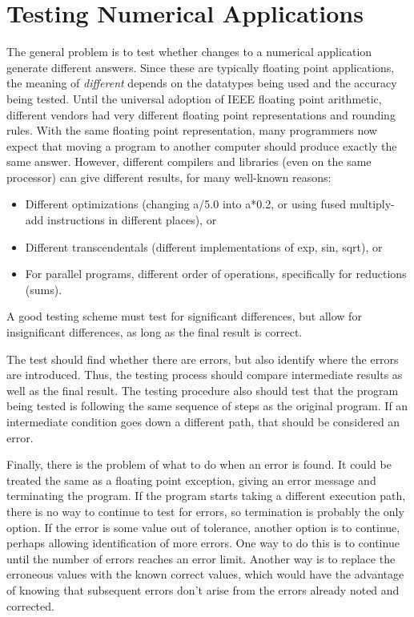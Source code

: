 \section{Testing Numerical Applications}

The general problem is to test whether changes to a numerical application generate different answers.
Since these are typically floating point applications, the meaning of \emph{different} depends on the datatypes being used and the accuracy being tested.
Until the universal adoption of IEEE floating point arithmetic\cite{goldberg.cs.91}, different vendors had very different floating point representations and rounding rules.
With the same floating point representation, many programmers now expect that moving a program to another computer should produce exactly the same answer.
However, different compilers and libraries (even on the same processor) can give different results, for many well-known reasons:
\begin{itemize}
\item Different optimizations (changing a/5.0 into a*0.2, or using fused multiply-add instructions in different places), or
\item Different transcendentals (different implementations of exp, sin, sqrt), or
\item For parallel programs, different order of operations, specifically for reductions (sums).
\end{itemize}
A good testing scheme must test for significant differences, but allow for insignificant differences, as long as the final result is correct.

The test should find whether there are errors, but also identify where the errors are introduced.
Thus, the testing process should compare intermediate results as well as the final result.
The testing procedure also should test that the program being tested is following the same sequence of steps as the original program.
If an intermediate condition goes down a different path, that should be considered an error.

Finally, there is the problem of what to do when an error is found.
It could be treated the same as a floating point exception, giving an error message and terminating the program.
If the program starts taking a different execution path, there is no way to continue to test for errors, so termination is probably the only option.
If the error is some value out of tolerance, another option is to continue, perhaps allowing identification of more errors.
One way to do this is to continue until the number of errors reaches an error limit.
Another way is to replace the erroneous values with the known correct values, which would have the advantage of knowing that subsequent errors don't arise from the errors already noted and corrected.

